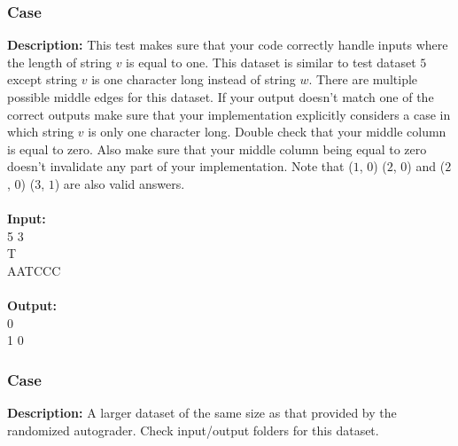 \documentclass{article}
\newcommand{\code}[1]{{\fontfamily{pcr}\selectfont #1}}
\begin{document}
\subsubsection*{Case }
\hline \vspace{5}
\textbf{Description:} This test makes sure that your code correctly handle inputs where the length of string $v$ is equal to one. This dataset is similar to test dataset $5$ except string $v$ is one character long instead of string $w$. There are multiple possible middle edges for this dataset. If your output doesn’t match one of the correct outputs make sure that your implementation explicitly considers a case in which string $v$ is only one character long. Double check that your middle column is equal to zero. Also make sure that your middle column being equal to zero doesn’t invalidate any part of your implementation. Note that ($1$, $0$) ($2$, $0$) and ($2$, $0$) ($3$, $1$) are also valid answers.\\ \\
\noindent \textbf{Input:}\\
\code{2 5 3\\T\\AATCCC}\\ \\
\noindent \textbf{Output:}\\
\code{0 0\\1 0}

\subsubsection*{Case }
\hline \vspace{5}
\textbf{Description:} A larger dataset of the same size as that provided by the randomized autograder. Check input/output folders for this dataset.\\ \\
\pagebreak
\end{document}

